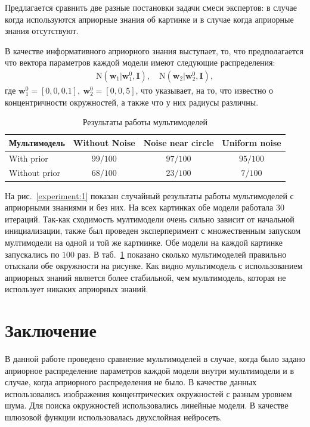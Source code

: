\documentclass[12pt, twoside]{article}
\numberwithin{equation}{section}
\begin{document}
Предлагается сравнить две разные постановки задачи смеси экспертов: в случае когда используются априорные знания об картинке и в случае когда априорные знания отсутствуют.

В качестве информативного априорного знания выступает, то, что предполагается что вектора параметров каждой модели имеют следующие распределения:
\begin{equation}
\label{eq:ce:1}
\begin{aligned}
\text{N}\left(\textbf{w}_1|\textbf{w}^{0}_{1}, \textbf{I}\right), \quad \text{N}\left(\textbf{w}_2|\textbf{w}^{0}_{2}, \textbf{I}\right),
\end{aligned}
\end{equation}
где $\textbf{w}^{0}_1 = [0, 0, 0.1],\ \textbf{w}^{0}_2 = [0, 0, 5]$, что указывает, на то, что известно о концентричности окружностей, а также что у них радиусы различны.

\begin{table}[h!t]
\begin{center}
\caption{Результаты работы мультимоделей}
\label{tb:ce:1}
\begin{tabular}{|c|c|c|c|}
\hline
	Мультимодель & Without Noise& Noise near circle& Uniform noise\\
	\hline
	\multicolumn{1}{|l|}{With prior}
	& $99/100$& $97/100$& $95/100$\\
	\hline
	\multicolumn{1}{|l|}{Without prior}
	& $68/100$& $23/100$& $7/100$\\
\hline

\end{tabular}
\end{center}
\end{table}

На рис.~\ref{experiment:1} показан случайный результаты работы мультимоделей с априорными знаниями и без них. На всех картинках обе модели работала $30$ итераций. Так-как сходимость мултимодели очень сильно зависит от начальной инициализации, также был проведен эксперперимент с множественным запуском мултимодели на одной и той же картиинке. Обе модели на каждой картинке запускались по $100$ раз. В таб.~\ref{tb:ce:1} показано сколько мультимоделей правильно отыскали обе окружности на рисунке. Как видно мультимодель с использованием априорных знаний является более стабильной, чем мультимодель, которая не использует никаких априорных знаний.



\section{Заключение}
В данной работе проведено сравнение мультимоделей в случае, когда было задано априорное распределение параметров каждой модели внутри мультимодели и в случае, когда априорного распределения не было. В качестве данных использовались изображения концентрических окружностей с разным уровнем шума. Для поиска окружностей использовались линейные модели. В качестве шлюзовой функции использовалась двухслойная нейросеть.
\end{document}
